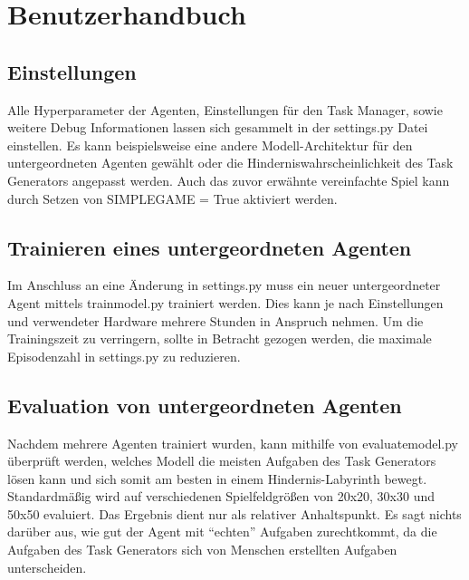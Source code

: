 \section{Benutzerhandbuch}\label{cap:benutzerhandbuch}
\subsection{Einstellungen}
Alle Hyperparameter der Agenten, Einstellungen für den Task Manager, sowie weitere Debug Informationen lassen sich gesammelt in der settings.py Datei einstellen. 
Es kann beispielsweise eine andere Modell-Architektur für den untergeordneten Agenten gewählt oder die Hinderniswahrscheinlichkeit des Task Generators angepasst werden. Auch das zuvor erwähnte vereinfachte Spiel kann durch Setzen von SIMPLE\textunderscore{}GAME = True
aktiviert werden. 

\subsection{Trainieren eines untergeordneten Agenten}
Im Anschluss an eine Änderung in settings.py muss ein neuer untergeordneter Agent mittels train\textunderscore{}model.py trainiert werden. Dies kann je nach Einstellungen und verwendeter Hardware mehrere Stunden in Anspruch nehmen. Um die Trainingszeit zu verringern, sollte in Betracht gezogen werden, die maximale Episodenzahl in settings.py zu reduzieren.

\subsection{Evaluation von untergeordneten Agenten}
Nachdem mehrere Agenten trainiert wurden, kann mithilfe von evaluate\textunderscore{}model.py überprüft werden, welches Modell die meisten Aufgaben des Task Generators lösen kann und sich somit am besten in einem Hindernis-Labyrinth bewegt. Standardmäßig wird auf verschiedenen Spielfeldgrößen von 20x20, 30x30 und 50x50 evaluiert.
Das Ergebnis dient nur als relativer Anhaltspunkt. Es sagt nichts darüber aus, wie gut der Agent mit “echten” Aufgaben zurechtkommt, da die Aufgaben des Task Generators sich von Menschen erstellten Aufgaben unterscheiden. 

